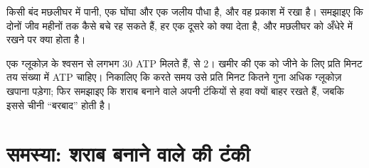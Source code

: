 \begin{exercise}[$\star\star\star$]\label{exo:g10:cell-metabolism:14}
किसी बंद मछलीघर में पानी, एक घोंघा और एक जलीय पौधा है, और वह प्रकाश में
रखा है। समझाइए कि दोनों जीव महीनों तक कैसे बचे रह सकते हैं, हर एक दूसरे
को क्या देता है, और मछलीघर को अँधेरे में रखने पर क्या होता है।
\end{exercise}

\begin{exercise}[$\star\star\star$]\label{exo:g10:cell-metabolism:15}
एक ग्लूकोज़ के श्वसन से लगभग 30 ATP मिलते हैं,  से 2। खमीर की एक
 को जीने के लिए प्रति मिनट तय संख्या में ATP चाहिए। निकालिए कि
 करते समय उसे प्रति मिनट कितने गुना अधिक ग्लूकोज़ खपाना पड़ेगा;
फिर समझाइए कि शराब बनाने वाले अपनी टंकियों से हवा क्यों बाहर रखते हैं,
जबकि इससे चीनी ``बरबाद'' होती है।
\end{exercise}

\section{समस्या: शराब बनाने वाले की टंकी}

